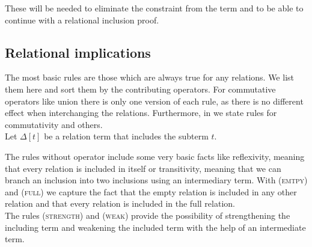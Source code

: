 \documentclass[a4paper,twoside,12pt, english]{article}
\begin{document}
These will be needed to eliminate the constraint from the term and to be able to continue with a relational inclusion proof. 


\subsection{Relational implications}\label{sec:implications}
The most basic rules are those which are always true for any relations. We list them here and sort them by the contributing operators. For commutative operators like union there is only one version of each rule, as there is no different effect when interchanging the relations. Furthermore, in  we state rules for commutativity and others. \\
Let $\Delta[t]$ be a relation term that includes the subterm $t$. 

The rules without operator include some very basic facts like reflexivity, meaning that every relation is included in itself or transitivity, meaning that we can branch an inclusion into two inclusions using an intermediary term. With (\textsc{emtpy}) and (\textsc{full}) we capture the fact that the empty relation is included in any other relation and that every relation is included in the full relation. \\
The rules (\textsc{strength}) and (\textsc{weak}) provide the possibility of strengthening the including term and weakening the included term with the help of an intermediate term. 
\end{document}
